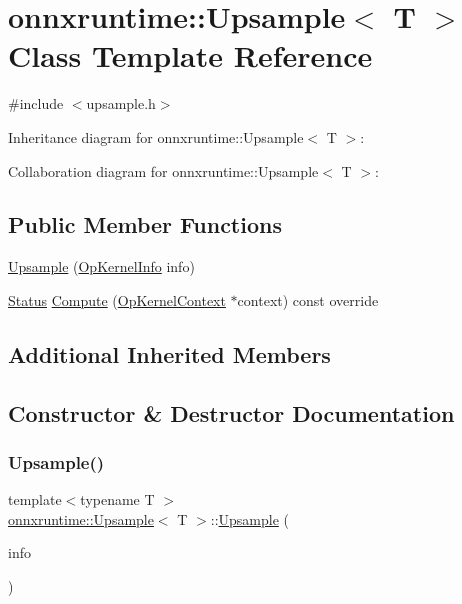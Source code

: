 \hypertarget{classonnxruntime_1_1Upsample}{}\section{onnxruntime\+:\+:Upsample$<$ T $>$ Class Template Reference}
\label{classonnxruntime_1_1Upsample}


{\ttfamily \#include $<$upsample.\+h$>$}



Inheritance diagram for onnxruntime\+:\+:Upsample$<$ T $>$\+:


Collaboration diagram for onnxruntime\+:\+:Upsample$<$ T $>$\+:
\subsection*{Public Member Functions}
\begin{DoxyCompactItemize}
\item 
\mbox{\hyperlink{classonnxruntime_1_1Upsample_ab6f0eab60b514c8c42e161beb3d7442d}{Upsample}} (\mbox{\hyperlink{classonnxruntime_1_1OpKernelInfo}{Op\+Kernel\+Info}} info)
\item 
\mbox{\hyperlink{classonnxruntime_1_1common_1_1Status}{Status}} \mbox{\hyperlink{classonnxruntime_1_1Upsample_a6c82c4d2350ce04f0222e1185294ae59}{Compute}} (\mbox{\hyperlink{classonnxruntime_1_1OpKernelContext}{Op\+Kernel\+Context}} $\ast$context) const override
\end{DoxyCompactItemize}
\subsection*{Additional Inherited Members}


\subsection{Constructor \& Destructor Documentation}
\mbox{\label{classonnxruntime_1_1Upsample_ab6f0eab60b514c8c42e161beb3d7442d}} 
\subsubsection{\texorpdfstring{Upsample()}{Upsample()}}
{\footnotesize\ttfamily template$<$typename T $>$ \\
\mbox{\hyperlink{classonnxruntime_1_1Upsample}{onnxruntime\+::\+Upsample}}$<$ T $>$\+::\mbox{\hyperlink{classonnxruntime_1_1Upsample}{Upsample}} (\begin{DoxyParamCaption}\item[{\mbox{\hyperlink{classonnxruntime_1_1OpKernelInfo}{Op\+Kernel\+Info}}}]{info }\end{DoxyParamCaption})\hspace{0.3cm}{\ttfamily [inline]}}




